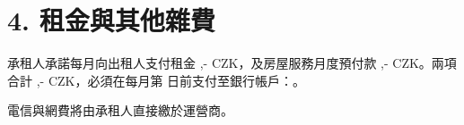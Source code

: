 \section*{4. 租金與其他雜費}
承租人承諾每月向出租人支付租金 \Rentrentamount,- CZK，及房屋服務月度預付款 \Rentservicesamount,- CZK。兩項合計 \Renttotalamount,- CZK，必須在每月第 \Rentpaymentday 日前支付至銀行帳戶：\Rentbankaccount。

電信與網費將由承租人直接繳於運營商。
